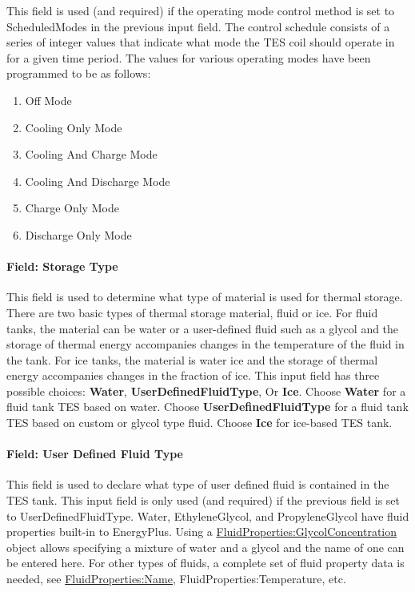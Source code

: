 This field is used (and required) if the operating mode control method is set to ScheduledModes in the previous input field. The control schedule consists of a series of integer values that indicate what mode the TES coil should operate in for a given time period. The values for various operating modes have been programmed to be as follows:

\begin{enumerate}
\def\labelenumi{\arabic{enumi}.}
\setcounter{enumi}{-1}
\item
  Off Mode
\item
  Cooling Only Mode
\item
  Cooling And Charge Mode
\item
  Cooling And Discharge Mode
\item
  Charge Only Mode
\item
  Discharge Only Mode
\end{enumerate}

\paragraph{Field: Storage Type}\label{field-storage-type}

This field is used to determine what type of material is used for thermal storage. There are two basic types of thermal storage material, fluid or ice. For fluid tanks, the material can be water or a user-defined fluid such as a glycol and the storage of thermal energy accompanies changes in the temperature of the fluid in the tank. For ice tanks, the material is water ice and the storage of thermal energy accompanies changes in the fraction of ice. This input field has three possible choices: \textbf{Water}, \textbf{UserDefinedFluidType}, Or \textbf{Ice}. Choose \textbf{Water} for a fluid tank TES based on water. Choose \textbf{UserDefinedFluidType} for a fluid tank TES based on custom or glycol type fluid. Choose \textbf{Ice} for ice-based TES tank.

\paragraph{Field: User Defined Fluid Type}\label{field-user-defined-fluid-type}

This field is used to declare what type of user defined fluid is contained in the TES tank. This input field is only used (and required) if the previous field is set to UserDefinedFluidType. Water, EthyleneGlycol, and PropyleneGlycol have fluid properties built-in to EnergyPlus. Using a \hyperref[fluidpropertiesglycolconcentration]{FluidProperties:GlycolConcentration} object allows specifying a mixture of water and a glycol and the name of one can be entered here. For other types of fluids, a complete set of fluid property data is needed, see \hyperref[fluidpropertiesname]{FluidProperties:Name}, FluidProperties:Temperature, etc.

